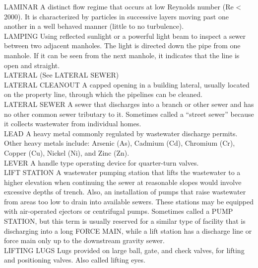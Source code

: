 \documentclass{article}
\begin{document}
LAMINAR
A distinct flow regime that occurs at low Reynolds number (Re < 2000). It is characterized by particles in successive layers moving past one another in a well behaved manner (little to no turbulence).
\vspace{0.3cm}\\
LAMPING
Using reflected sunlight or a powerful light beam to inspect a sewer between two adjacent manholes. The light is directed down the pipe from one manhole. If it can be seen from the next manhole, it indicates that the line is open and straight. 
\vspace{0.3cm}\\
LATERAL
(See LATERAL SEWER) 
\vspace{0.3cm}\\
LATERAL CLEANOUT
A capped opening in a building lateral, usually located on the property line, through which the pipelines can be cleaned. 
\vspace{0.3cm}\\
LATERAL SEWER
A sewer that discharges into a branch or other sewer and has no other common sewer tributary to it. Sometimes called a “street sewer” because it collects wastewater from individual homes. 
\vspace{0.3cm}\\
LEAD
A heavy metal commonly regulated by wastewater discharge permits. Other heavy metals include: Arsenic (As), Cadmium (Cd), Chromium (Cr), Copper (Cu), Nickel (Ni), and Zinc (Zn).
\vspace{0.3cm}\\
LEVER
A handle type operating device for quarter-turn valves.
\vspace{0.3cm}\\
LIFT STATION
A wastewater pumping station that lifts the wastewater to a higher elevation when continuing the sewer at reasonable slopes would involve excessive depths of trench. Also, an installation of pumps that raise wastewater from areas too low to drain into available sewers. These stations may be equipped with air-operated ejectors or centrifugal pumps. Sometimes called a PUMP STATION, but this term is usually reserved for a similar type of facility that is discharging into a long FORCE MAIN, while a lift station has a discharge line or force main only up to the downstream gravity sewer. 
\vspace{0.3cm}\\
LIFTING LUGS
Lugs provided on large ball, gate, and check valves, for lifting and positioning valves. Also called lifting eyes.
\vspace{0.3cm}\\
\end{document}
